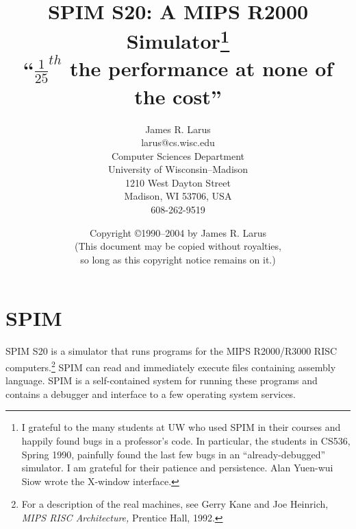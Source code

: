 \documentclass[11pt]{article}
\begin{document}
\title{SPIM S20: A MIPS R2000 Simulator\thanks
{I grateful to the many students at UW who used SPIM in their courses
and happily found bugs in a professor's code.  In particular, the
students in CS536, Spring 1990, painfully found the last few bugs in
an ``already-debugged'' simulator.  I am grateful for their patience
and persistence.  Alan Yuen-wui Siow wrote the X-window interface.}
\\
{\small ``$\frac{1}{25}^{th}$ the performance at none of 	the
cost''}}

\author{{\normalsize James R. Larus} \\
	{\normalsize larus@cs.wisc.edu} \\
	{\normalsize Computer Sciences Department} \\
	{\normalsize University of Wisconsin--Madison} \\
	{\normalsize 1210 West Dayton Street} \\
	{\normalsize Madison, WI 53706, USA} \\
	{\normalsize 608-262-9519}}

\date{Copyright \copyright 1990--2004 by James R. Larus \\
      (This document may be copied without royalties, \\
	so long as this copyright notice remains on it.)}

\maketitle


\newcommand {\pinst} [2]%
	{\bigskip\noindent{\em{{\tt #1}\hfill#2 ${}^{\dagger}$\newline}}}
\newcommand {\inst} [2]%
	 {\bigskip\noindent{\em{{\tt #1}\hfill#2\newline}}}
\newcommand {\pinstX} [2]%
	{\noindent{\em{{\tt #1}\hfill#2 ${}^{\dagger}$\newline}}}
\newcommand {\instX} [2]%
	{\noindent{\em{{\tt #1}\hfill#2\newline}}}


\section{SPIM}

SPIM S20 is a simulator that runs programs for the MIPS R2000/R3000 RISC
computers.\footnote{For a description of the real machines, see Gerry Kane
and Joe Heinrich, {\em MIPS RISC Architecture,\/} Prentice Hall, 1992.} SPIM
can read and immediately execute files containing assembly language.  SPIM
is a self-contained system for running these programs and contains a
debugger and interface to a few operating system services.
\end{document}
